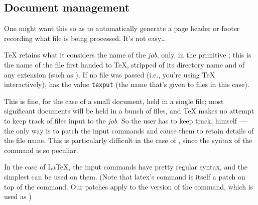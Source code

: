 \subsection{Document management}


One might want this so as to automatically generate a page header or
footer recording what file is being processed.  It's not easy\dots{}

\TeX{} retains what it considers the name of the \emph{job}, only, in
the primitive ; this is the name of the file first
handed to \TeX{}, stripped of its directory name and of any extension
(such as ).  If no file was passed (i.e., you're using
\TeX{} interactively),  has the value \texttt{texput}
(the name that's given to  files in this case).

This is fine, for the case of a small document, held in a single file;
most significant documents will be held in a bunch of files, and
\TeX{} makes no attempt to keep track of files input to the
\emph{job}.  So the user has to keep track, himself~--- the only way
is to patch the input commands and cause them to retain details of the
file name.  This is particularly difficult in the case of \plaintex{},
since the syntax of the  command is so peculiar.

In the case of \LaTeX{}, the input commands have pretty regular
syntax, and the simplest  can be
used on them.  (Note that latex{}'s  command is itself a
patch on top of the \plaintex{} command.  Our patches apply to the
\latex{} version of the command, which is used as )


